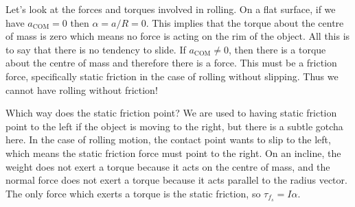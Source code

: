 \documentclass[../classical_mechanics.tex]{subfiles}
\begin{document}
        Let's look at the forces and torques involved in rolling.
        On a flat surface, if we have $a_\text{COM}=0$ then $\alpha=a/R=0$.
        This implies that the torque about the centre of mass is zero which means no force is acting on the rim of the object.
        All this is to say that there is no tendency to slide.
        If $a_\text{COM}\neq 0$, then there is a torque about the centre of mass and therefore there is a force.
        This must be a friction force, specifically static friction in the case of rolling without slipping.
        Thus we cannot have rolling without friction!

        Which way does the static friction point?
        We are used to having static friction point to the left if the object is moving to the right, but there is a subtle gotcha here.
        In the case of rolling motion, the contact point wants to slip to the left, which means the static friction force must point to the right.
        On an incline, the weight does not exert a torque because it acts on the centre of mass, and the normal force does not exert a torque because it acts parallel to the radius vector.
        The only force which exerts a torque is the static friction, so $\tau_{f_s}=I\alpha$.
\end{document}
